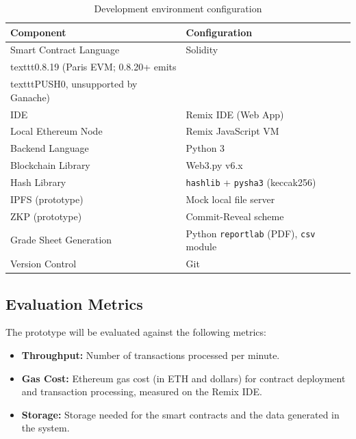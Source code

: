 \documentclass[conference]{IEEEtran}
\begin{document}
\begin{table}[!h]
\centering
\caption{Development environment configuration}
\label{tab:devenv}
\renewcommand{\arraystretch}{1.3}
\begin{tabular}{p{3cm} p{5cm}}
\toprule
\textbf{Component} & \textbf{Configuration} \\
\midrule
Smart Contract Language & Solidity \\texttt{0.8.19} (Paris EVM; 0.8.20+ emits \\texttt{PUSH0}, unsupported by Ganache) \\
IDE & Remix IDE (Web App) \\
Local Ethereum Node & Remix JavaScript VM  \\
Backend Language & Python 3 \\
Blockchain Library & Web3.py v6.x \\
Hash Library & \texttt{hashlib} + \texttt{pysha3} (keccak256) \\
IPFS (prototype) & Mock local file server \\
ZKP (prototype) & Commit-Reveal scheme \\
Grade Sheet Generation & Python \texttt{reportlab} (PDF), \texttt{csv} module \\
Version Control & Git \\
\bottomrule
\end{tabular}
\end{table}


\subsection{Evaluation Metrics}

The prototype will be evaluated against the following metrics:

\begin{itemize}
    \item \textbf{Throughput:} Number of transactions processed per minute. 
    \item \textbf{Gas Cost:} Ethereum gas cost (in ETH and dollars) for
    contract deployment and transaction processing, measured on
    the Remix IDE.
    \item \textbf{Storage:} Storage needed for the smart contracts and the data generated in the system.
\end{itemize}
\end{document}
